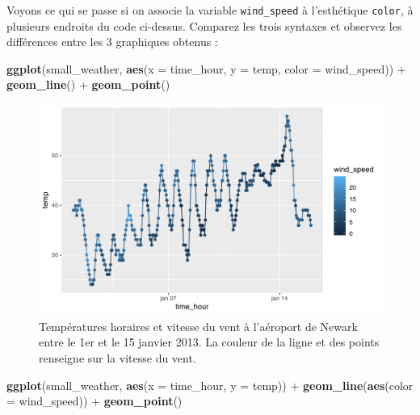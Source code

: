 \documentclass[a4paperpaper,]{article}
\newenvironment{Shaded}{\begin{snugshade}}{\end{snugshade}}
\newcommand{\DataTypeTok}[1]{\textcolor[rgb]{0.00,0.34,0.68}{#1}}
\newcommand{\KeywordTok}[1]{\textcolor[rgb]{0.12,0.11,0.11}{\textbf{#1}}}
\newcommand{\NormalTok}[1]{\textcolor[rgb]{0.12,0.11,0.11}{#1}}
\newcommand{\OperatorTok}[1]{\textcolor[rgb]{0.12,0.11,0.11}{#1}}
\newcommand{\StringTok}[1]{\textcolor[rgb]{0.75,0.01,0.01}{#1}}
\begin{document}
Voyons ce qui se passe si on associe la variable \texttt{wind\_speed} à l'esthétique \texttt{color}, à plusieurs endroits du code ci-dessus. Comparez les trois syntaxes et observez les différences entre les 3 graphiques obtenus :

\begin{Shaded}
\begin{Highlighting}[]
\KeywordTok{ggplot}\NormalTok{(small_weather, }\KeywordTok{aes}\NormalTok{(}\DataTypeTok{x =}\NormalTok{ time_hour, }\DataTypeTok{y =}\NormalTok{ temp, }\DataTypeTok{color =}\NormalTok{ wind_speed)) }\OperatorTok{+}
\StringTok{  }\KeywordTok{geom_line}\NormalTok{() }\OperatorTok{+}
\StringTok{  }\KeywordTok{geom_point}\NormalTok{()}
\end{Highlighting}
\end{Shaded}

\begin{figure}[htpb]

{\centering \includegraphics[width=0.9\linewidth]{figure/wind-1} 

}

\caption{Températures horaires et vitesse du vent à l'aéroport de Newark entre le 1er et le 15 janvier 2013. La couleur de la ligne et des points renseigne sur la vitesse du vent.}\label{fig:wind}
\end{figure}

\begin{Shaded}
\begin{Highlighting}[]
\KeywordTok{ggplot}\NormalTok{(small_weather, }\KeywordTok{aes}\NormalTok{(}\DataTypeTok{x =}\NormalTok{ time_hour, }\DataTypeTok{y =}\NormalTok{ temp)) }\OperatorTok{+}
\StringTok{  }\KeywordTok{geom_line}\NormalTok{(}\KeywordTok{aes}\NormalTok{(}\DataTypeTok{color =}\NormalTok{ wind_speed)) }\OperatorTok{+}
\StringTok{  }\KeywordTok{geom_point}\NormalTok{()}
\end{Highlighting}
\end{Shaded}
\end{document}
